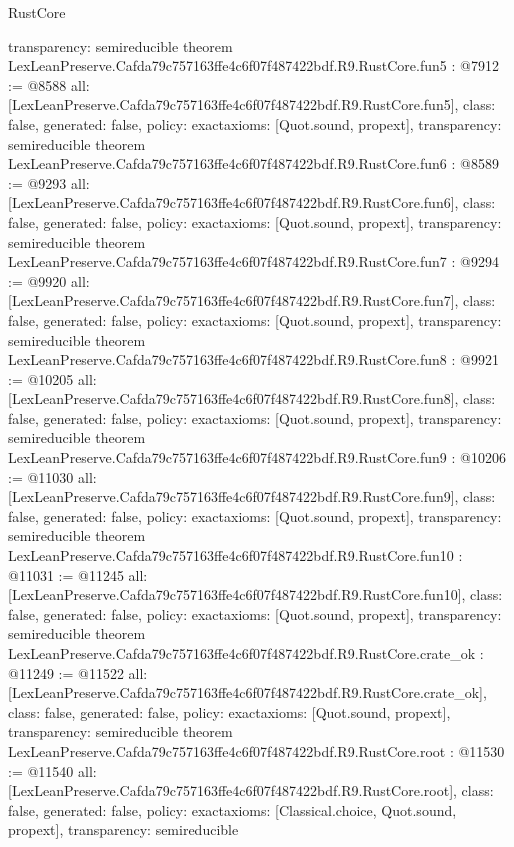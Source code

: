 \begin{lexlean}{RustCore}
\begin{coremodule}
{  transparency: semireducible
}
theorem LexLeanPreserve.Cafda79c757163ffe4c6f07f487422bdf.R9.RustCore.fun5 : @7912 := @8588 {
  all: [LexLeanPreserve.Cafda79c757163ffe4c6f07f487422bdf.R9.RustCore.fun5],
  class: false,
  generated: false,
  policy: exact{axioms: [Quot.sound, propext]},
  transparency: semireducible
}
theorem LexLeanPreserve.Cafda79c757163ffe4c6f07f487422bdf.R9.RustCore.fun6 : @8589 := @9293 {
  all: [LexLeanPreserve.Cafda79c757163ffe4c6f07f487422bdf.R9.RustCore.fun6],
  class: false,
  generated: false,
  policy: exact{axioms: [Quot.sound, propext]},
  transparency: semireducible
}
theorem LexLeanPreserve.Cafda79c757163ffe4c6f07f487422bdf.R9.RustCore.fun7 : @9294 := @9920 {
  all: [LexLeanPreserve.Cafda79c757163ffe4c6f07f487422bdf.R9.RustCore.fun7],
  class: false,
  generated: false,
  policy: exact{axioms: [Quot.sound, propext]},
  transparency: semireducible
}
theorem LexLeanPreserve.Cafda79c757163ffe4c6f07f487422bdf.R9.RustCore.fun8 : @9921 := @10205 {
  all: [LexLeanPreserve.Cafda79c757163ffe4c6f07f487422bdf.R9.RustCore.fun8],
  class: false,
  generated: false,
  policy: exact{axioms: [Quot.sound, propext]},
  transparency: semireducible
}
theorem LexLeanPreserve.Cafda79c757163ffe4c6f07f487422bdf.R9.RustCore.fun9 : @10206 := @11030 {
  all: [LexLeanPreserve.Cafda79c757163ffe4c6f07f487422bdf.R9.RustCore.fun9],
  class: false,
  generated: false,
  policy: exact{axioms: [Quot.sound, propext]},
  transparency: semireducible
}
theorem LexLeanPreserve.Cafda79c757163ffe4c6f07f487422bdf.R9.RustCore.fun10 : @11031 := @11245 {
  all: [LexLeanPreserve.Cafda79c757163ffe4c6f07f487422bdf.R9.RustCore.fun10],
  class: false,
  generated: false,
  policy: exact{axioms: [Quot.sound, propext]},
  transparency: semireducible
}
theorem LexLeanPreserve.Cafda79c757163ffe4c6f07f487422bdf.R9.RustCore.crate_ok : @11249 := @11522 {
  all: [LexLeanPreserve.Cafda79c757163ffe4c6f07f487422bdf.R9.RustCore.crate_ok],
  class: false,
  generated: false,
  policy: exact{axioms: [Quot.sound, propext]},
  transparency: semireducible
}
theorem LexLeanPreserve.Cafda79c757163ffe4c6f07f487422bdf.R9.RustCore.root : @11530 := @11540 {
  all: [LexLeanPreserve.Cafda79c757163ffe4c6f07f487422bdf.R9.RustCore.root],
  class: false,
  generated: false,
  policy: exact{axioms: [Classical.choice, Quot.sound, propext]},
  transparency: semireducible
}


\end{coremodule}
\end{lexlean}
